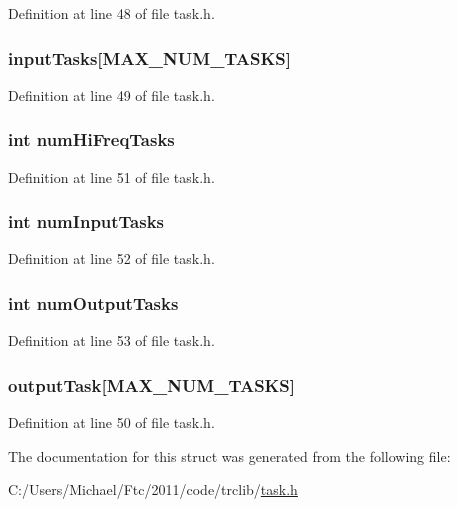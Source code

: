 Definition at line 48 of file task.h.

\hypertarget{struct_t_a_s_k_s_a4d918bead167ab6fc72ed48fae20dcbc}{
\subsubsection[{inputTasks}]{ {\bf inputTasks}\mbox{[}MAX\_\-NUM\_\-TASKS\mbox{]}}}
\label{struct_t_a_s_k_s_a4d918bead167ab6fc72ed48fae20dcbc}


Definition at line 49 of file task.h.

\hypertarget{struct_t_a_s_k_s_a5eadb4e03834b57f982a7dae230074c7}{
\subsubsection[{numHiFreqTasks}]{\setlength{\rightskip}{0pt plus 5cm}int {\bf numHiFreqTasks}}}
\label{struct_t_a_s_k_s_a5eadb4e03834b57f982a7dae230074c7}


Definition at line 51 of file task.h.

\hypertarget{struct_t_a_s_k_s_a8db3ae4e645f876a98a76a901ebb4ac6}{
\subsubsection[{numInputTasks}]{\setlength{\rightskip}{0pt plus 5cm}int {\bf numInputTasks}}}
\label{struct_t_a_s_k_s_a8db3ae4e645f876a98a76a901ebb4ac6}


Definition at line 52 of file task.h.

\hypertarget{struct_t_a_s_k_s_a1d2d6944f7d3fe57ac9b7bf7959af091}{
\subsubsection[{numOutputTasks}]{\setlength{\rightskip}{0pt plus 5cm}int {\bf numOutputTasks}}}
\label{struct_t_a_s_k_s_a1d2d6944f7d3fe57ac9b7bf7959af091}


Definition at line 53 of file task.h.

\hypertarget{struct_t_a_s_k_s_accec851bb1a610fff25b5c3a49cc10c0}{
\subsubsection[{outputTask}]{ {\bf outputTask}\mbox{[}MAX\_\-NUM\_\-TASKS\mbox{]}}}
\label{struct_t_a_s_k_s_accec851bb1a610fff25b5c3a49cc10c0}


Definition at line 50 of file task.h.



The documentation for this struct was generated from the following file:\begin{DoxyCompactItemize}
\item 
C:/Users/Michael/Ftc/2011/code/trclib/\hyperlink{task_8h}{task.h}\end{DoxyCompactItemize}
